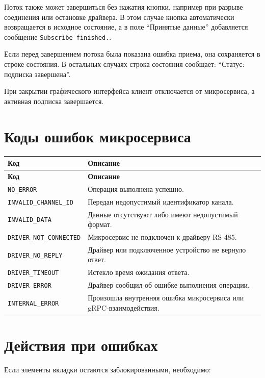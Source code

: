 Поток также может завершиться без нажатия кнопки, например при разрыве
соединения или остановке драйвера. В этом случае кнопка автоматически
возвращается в исходное состояние, а в поле ``Принятые данные'' добавляется
сообщение \texttt{Subscribe finished.}.

Если перед завершением потока была показана ошибка приема, она сохраняется в
строке состояния. В остальных случаях строка состояния сообщает:
``Статус: подписка завершена''.

При закрытии графического интерфейса клиент отключается от микросервиса, а
активная подписка завершается.

\section{Коды ошибок микросервиса}

\begin{longtable}{|p{}|p{}|}
	\hline
	\textbf{Код} & \textbf{Описание} \\
	\hline
	\endfirsthead
	\hline
	\textbf{Код} & \textbf{Описание} \\
	\hline
	\endhead
	\texttt{NO\_ERROR} & Операция выполнена успешно. \\
	\hline
	\texttt{INVALID\_CHANNEL\_ID} & Передан недопустимый идентификатор канала. \\
	\hline
	\texttt{INVALID\_DATA} & Данные отсутствуют либо имеют недопустимый формат. \\
	\hline
	\texttt{DRIVER\_NOT\_CONNECTED} & Микросервис не подключен к драйверу RS-485. \\
	\hline
	\texttt{DRIVER\_NO\_REPLY} & Драйвер или подключенное устройство не вернуло ответ. \\
	\hline
	\texttt{DRIVER\_TIMEOUT} & Истекло время ожидания ответа. \\
	\hline
	\texttt{DRIVER\_ERROR} & Драйвер сообщил об ошибке выполнения операции. \\
	\hline
	\texttt{INTERNAL\_ERROR} & Произошла внутренняя ошибка микросервиса или gRPC-взаимодействия. \\
	\hline
\end{longtable}

\section{Действия при ошибках}

Если элементы вкладки остаются заблокированными, необходимо:

